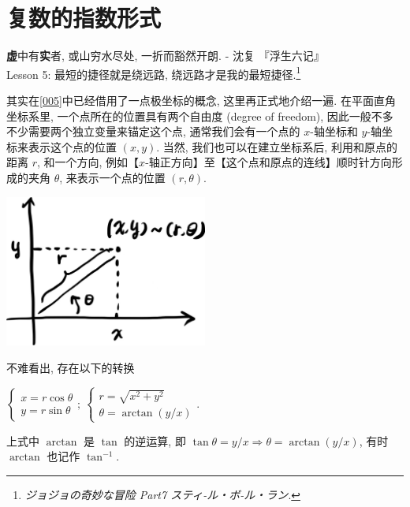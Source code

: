 \section{复数的指数形式}\label{009}

\begin{flushright}{\kaishu \textbf{虚}中有\textbf{实}者, 或山穷水尽处, 一折而豁然开朗. - 沈复
『浮生六记』 \\Lesson 5: 最短的捷径就是绕远路,
绕远路才是我的最短捷径.\footnote{\emph{ジョジョの奇妙な冒险 Part7
  スティ-ル・ボ-ル・ラン}.}}\end{flushright}

\begin{tcolorbox}[size=fbox, breakable, enhanced jigsaw, title={极坐标 (polar coordinate)}]

其实在\ref{005}中已经借用了一点极坐标的概念, 这里再正式地介绍一遍.
在平面直角坐标系里, 一个点所在的位置具有两个自由度 (degree of freedom),
因此一般不多不少需要两个独立变量来锚定这个点, 通常我们会有一个点的
$x$-轴坐标和 $y$-轴坐标来表示这个点的位置 $(x,y)$. 当然,
我们也可以在建立坐标系后, 利用和原点的距离 $r$, 和一个方向,
例如【$x$-轴正方向】至【这个点和原点的连线】顺时针方向形成的夹角
$\theta$, 来表示一个点的位置 $(r,\theta)$.

\begin{tcolorbox}[size=fbox, breakable, enhanced jigsaw]
\includegraphics[width=0.5\textwidth]{img/image-20230418112700129.png}

\end{tcolorbox}

不难看出, 存在以下的转换

$\begin{cases}x=r\cos\theta\\y=r\sin\theta\end{cases};\ \begin{cases}r=\sqrt{x^2+y^2}\\\theta=\arctan (y/x)\end{cases}.$

上式中 $\arctan$ 是 $\tan$ 的逆运算, 即
$\tan\theta=y/x\Rightarrow \theta=\arctan (y/x)$, 有时 $\arctan$
也记作 $\tan^{-1}$.

\end{tcolorbox}

